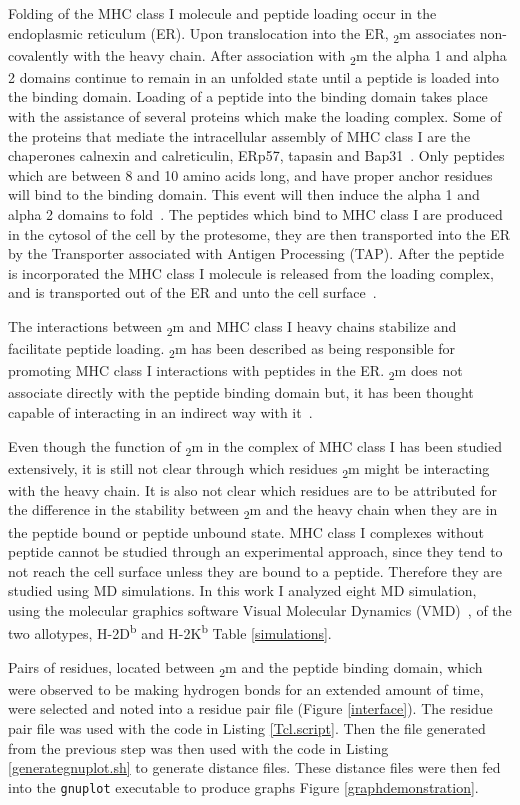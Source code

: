 \documentclass[11pt,twocolumn]{article}
\newcommand{\db}{H-2D\textsuperscript{b}\xspace}
\newcommand{\kb}{H-2K\textsuperscript{b}\xspace}
\newcommand{\btm}{\textbeta\textsubscript{2}m\xspace}
\begin{document}
Folding of the MHC class I molecule and peptide loading occur in the endoplasmic reticulum (ER). Upon translocation 
into the ER, \btm associates non-covalently with the heavy chain. After association with \btm the 
alpha 1 and alpha 2 domains continue to remain in an unfolded state until a peptide is loaded into the binding domain. 
Loading of a peptide into the binding domain takes place with the assistance of several proteins which make the 
loading complex. Some of the proteins that mediate the intracellular assembly of MHC class I are the chaperones calnexin and 
calreticulin, ERp57, tapasin and Bap31~\cite{zhang2006assembly}. Only peptides which are between 8 and 10 amino acids 
long, and have proper anchor residues will bind to the binding domain. This event will then induce  the 
alpha 1 and alpha 2 domains to fold~\cite{simone2012analysis}. The peptides which bind to MHC class I are produced in the 
cytosol of the cell by the protesome, they are then transported into the ER by the Transporter associated with 
Antigen Processing (TAP). After the peptide is incorporated the MHC class I molecule is released from the loading 
complex, and is transported out of the ER and unto the cell surface~\cite{lundegaard2012predictions}.


The interactions between \btm and MHC class I heavy chains stabilize and facilitate 
peptide loading. \btm has been described as being responsible for promoting MHC class I interactions with  peptides in the ER.
\btm does not associate directly with the peptide binding domain but, it has been thought capable of interacting in an indirect way with  it~\cite{smith1993alteration}.

Even though the function of \btm in the complex of MHC class I has been studied extensively, it is still not clear through which 
residues  \btm might be interacting with the heavy chain. It is also not clear which residues are to be attributed for the difference in the stability between \btm and the heavy chain when they are in the peptide bound or peptide unbound state. MHC class I complexes without peptide cannot be studied through an experimental approach, since they tend to not reach the cell surface unless they are bound to a peptide. Therefore they are studied 
using MD simulations. In this work I analyzed eight MD simulation, using the molecular graphics software Visual Molecular Dynamics (VMD)~\cite{vmd96}, of the two allotypes, \db and \kb Table \ref{simulations}. 

Pairs of residues, located between \btm and the peptide binding domain, which were observed to be making hydrogen bonds for an extended amount of time, were selected and noted into a residue pair file (Figure \ref{interface}). The residue pair file was used with the code in Listing \ref{Tcl.script}.  Then the  file generated from the previous step was then used with the code in Listing \ref{generategnuplot.sh} to generate distance files. These distance files were then fed into the \texttt{gnuplot} executable to produce graphs Figure \ref{graphdemonstration}. 
\end{document}

